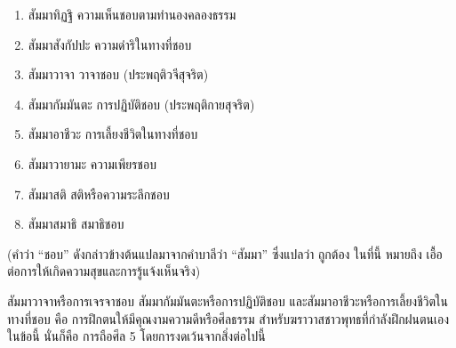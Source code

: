 \documentclass[12pt, openany]{book}
\begin{document}
\begin{enumerate}

\item สัมมา{\wbr}ทิฏฐิ ความเห็น{\wbr}ชอบ{\wbr}ตาม{\wbr}ทำนอง{\wbr}คลอง{\wbr}ธรรม{\wbr}

\item สัมมา{\wbr}สังกัปปะ ความ{\wbr}ดำริ{\wbr}ใน{\wbr}ทาง{\wbr}ที่{\wbr}ชอบ{\wbr}

\item สัมมา{\wbr}วาจา วาจา{\wbr}ชอบ (ประพฤติ{\wbr}วจี{\wbr}สุจริต)

\item สัมมา{\wbr}กัมมันตะ การ{\wbr}ปฏิบัติ{\wbr}ชอบ (ประพฤติ{\wbr}กาย{\wbr}สุจริต)

\item สัมมา{\wbr}อาชีวะ การ{\wbr}เลี้ยง{\wbr}ชีวิต{\wbr}ใน{\wbr}ทาง{\wbr}ที่{\wbr}ชอบ{\wbr}

\item สัมมา{\wbr}วายามะ ความ{\wbr}เพียร{\wbr}ชอบ{\wbr}

\item สัมมา{\wbr}สติ สติ{\wbr}หรือ{\wbr}ความ{\wbr}ระลึก{\wbr}ชอบ{\wbr}

\item สัมมา{\wbr}สมาธิ สมาธิ{\wbr}ชอบ{\wbr}

\end{enumerate}

({\wbr}คำ{\wbr}ว่า “ชอบ” ดัง{\wbr}กล่าว{\wbr}ข้าง{\wbr}ต้น{\wbr}แปล{\wbr}มา{\wbr}จาก{\wbr}คำ{\wbr}บาลี{\wbr}ว่า “สัมมา” ซึ่ง{\wbr}แปล{\wbr}ว่า ถูกต้อง ใน{\wbr}ที่{\wbr}นี้ หมาย{\wbr}ถึง เอื้อ{\wbr}ต่อ{\wbr}การ{\wbr}ให้{\wbr}เกิด{\wbr}ความ{\wbr}สุข{\wbr}และ{\wbr}การ{\wbr}รู้แจ้ง{\wbr}เห็น{\wbr}จริง)

สัมมา{\wbr}วาจา{\wbr}หรือ{\wbr}การ{\wbr}เจรจา{\wbr}ชอบ สัมมา{\wbr}กัมมันตะ{\wbr}หรือ{\wbr}การ{\wbr}ปฏิบัติ{\wbr}ชอบ และ{\wbr}สัมมา{\wbr}อาชีวะ{\wbr}หรือ{\wbr}การ{\wbr}เลี้ยง{\wbr}ชีวิต{\wbr}ใน{\wbr}ทาง{\wbr}ที่{\wbr}ชอบ คือ การ{\wbr}ฝึก{\wbr}ตน{\wbr}ให้{\wbr}มี{\wbr}คุณ{\wbr}งาม{\wbr}ความ{\wbr}ดี{\wbr}หรือ{\wbr}ศีลธรรม  สำหรับ{\wbr}ฆราวาส{\wbr}ชาว{\wbr}พุทธ{\wbr}ที่{\wbr}กำลัง{\wbr}ฝึกฝน{\wbr}ตนเอง{\wbr}ใน{\wbr}ข้อ{\wbr}นี้ นั่น{\wbr}ก็{\wbr}คือ การ{\wbr}ถือ{\wbr}ศีล 5 โดย{\wbr}การ{\wbr}งดเว้น{\wbr}จาก{\wbr}สิ่ง{\wbr}ต่อ{\wbr}ไป{\wbr}นี้ 
\end{document}
